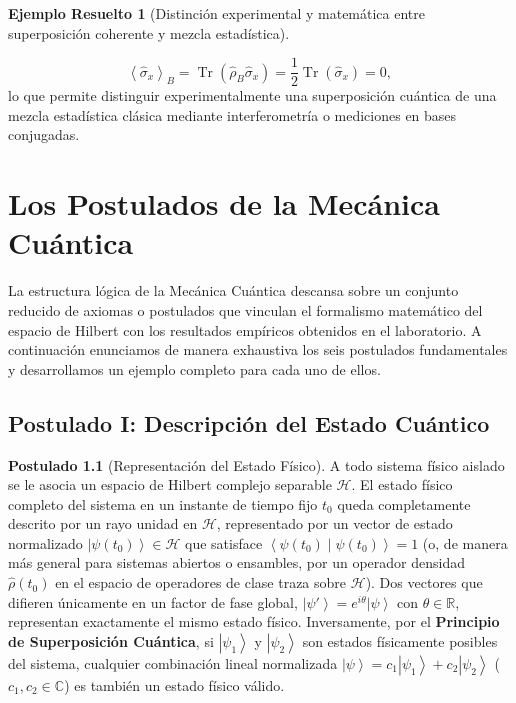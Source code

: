 \documentclass[11pt,a4paper,twoside]{report}
\theoremstyle{definition}
\newtheorem{postulado}{Postulado}[chapter]
\newtheorem{ejemplo}{Ejemplo Resuelto}[chapter]
\theoremstyle{plain}
\theoremstyle{remark}
\newcommand{\ket}[1]{\left| #1 \right\rangle}
\newcommand{\braket}[2]{\left\langle #1 \middle| #2 \right\rangle}
\newcommand{\expval}[1]{\left\langle #1 \right\rangle}
\newcommand{\tr}{\operatorname{Tr}}
\newcommand{\Hil}{\mathcal{H}}
\newcommand{\op}[1]{\hat{#1}}
\begin{document}
\begin{ejemplo}[Distinción experimental y matemática entre superposición coherente y mezcla estadística]
\begin{itemize}
    \begin{equation}
        \expval{\op{\sigma}_x}_B = \tr(\op{\rho}_B \op{\sigma}_x) = \frac{1}{2}\tr(\op{\sigma}_x) = 0,
    \end{equation}
    lo que permite distinguir experimentalmente una superposición cuántica de una mezcla estadística clásica mediante interferometría o mediciones en bases conjugadas.
\end{itemize}
\end{ejemplo}

\chapter{Los Postulados de la Mecánica Cuántica}

La estructura lógica de la Mecánica Cuántica descansa sobre un conjunto reducido de axiomas o postulados que vinculan el formalismo matemático del espacio de Hilbert con los resultados empíricos obtenidos en el laboratorio. A continuación enunciamos de manera exhaustiva los seis postulados fundamentales y desarrollamos un ejemplo completo para cada uno de ellos.

\section{Postulado I: Descripción del Estado Cuántico}

\begin{postulado}[Representación del Estado Físico]
A todo sistema físico aislado se le asocia un espacio de Hilbert complejo separable $\Hil$. El estado físico completo del sistema en un instante de tiempo fijo $t_0$ queda completamente descrito por un rayo unidad en $\Hil$, representado por un vector de estado normalizado $\ket{\psi(t_0)} \in \Hil$ que satisface $\braket{\psi(t_0)}{\psi(t_0)} = 1$ (o, de manera más general para sistemas abiertos o ensambles, por un operador densidad $\op{\rho}(t_0)$ en el espacio de operadores de clase traza sobre $\Hil$). Dos vectores que difieren únicamente en un factor de fase global, $\ket{\psi'} = e^{i\theta}\ket{\psi}$ con $\theta \in \mathbb{R}$, representan exactamente el mismo estado físico. Inversamente, por el \textbf{Principio de Superposición Cuántica}, si $\ket{\psi_1}$ y $\ket{\psi_2}$ son estados físicamente posibles del sistema, cualquier combinación lineal normalizada $\ket{\psi} = c_1\ket{\psi_1} + c_2\ket{\psi_2}$ ($c_1, c_2 \in \mathbb{C}$) es también un estado físico válido.
\end{postulado}
\end{document}
